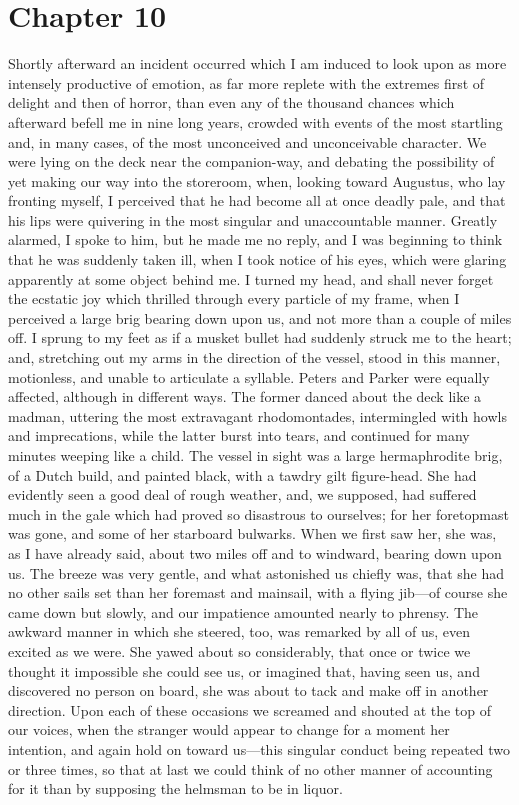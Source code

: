 \section{Chapter 10}
Shortly afterward an incident occurred which I am induced to look upon
as more intensely productive of emotion, as far more replete with the extremes
first of delight and then of horror, than even any of the thousand chances which
afterward befell me in nine long years, crowded with events of the most
startling and, in many cases, of the most unconceived and unconceivable
character. We were lying on the deck near the companion-way, and debating the
possibility of yet making our way into the storeroom, when, looking toward
Augustus, who lay fronting myself, I perceived that he had become all at once
deadly pale, and that his lips were quivering in the most singular and
unaccountable manner. Greatly alarmed, I spoke to him, but he made me no reply,
and I was beginning to think that he was suddenly taken ill, when I took notice
of his eyes, which were glaring apparently at some object behind me. I turned my
head, and shall never forget the ecstatic joy which thrilled through every
particle of my frame, when I perceived a large brig bearing down upon us, and
not more than a couple of miles off. I sprung to my feet as if a musket bullet
had suddenly struck me to the heart; and, stretching out my arms in the
direction of the vessel, stood in this manner, motionless, and unable to
articulate a syllable. Peters and Parker were equally affected, although in
different ways. The former danced about the deck like a madman, uttering the
most extravagant rhodomontades, intermingled with howls and imprecations, while
the latter burst into tears, and continued for many minutes weeping like a
child. The vessel in sight was a large hermaphrodite brig, of a Dutch build, and
painted black, with a tawdry gilt figure-head. She had evidently seen a good
deal of rough weather, and, we supposed, had suffered much in the gale which had
proved so disastrous to ourselves; for her foretopmast was gone, and some of her
starboard bulwarks. When we first saw her, she was, as I have already said,
about two miles off and to windward, bearing down upon us. The breeze was very
gentle, and what astonished us chiefly was, that she had no other sails set than
her foremast and mainsail, with a flying jib---of course she came down but
slowly, and our impatience amounted nearly to phrensy. The awkward manner in
which she steered, too, was remarked by all of us, even excited as we were. She
yawed about so considerably, that once or twice we thought it impossible she
could see us, or imagined that, having seen us, and discovered no person on
board, she was about to tack and make off in another direction. Upon each of
these occasions we screamed and shouted at the top of our voices, when the
stranger would appear to change for a moment her intention, and again hold on
toward us---this singular conduct being repeated two or three times, so that at
last we could think of no other manner of accounting for it than by supposing
the helmsman to be in liquor. 

